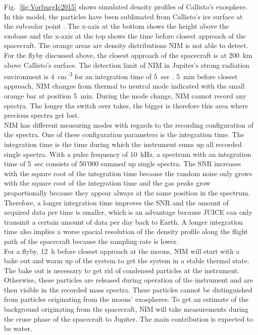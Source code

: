 	Fig.~\ref{fig:VorburgIc2015} shows simulated density profiles of Callisto's exosphere. In this model, the particles have been sublimated from Callisto's ice surface at the sub-solar point \cite{Vorburger2015}. The x-axis at the bottom shows the height above the exobase and the x-axis at the top shows the time before closest approach of the spacecraft. The orange areas are density distributions NIM is not able to detect. For the flyby discussed above, the closest approach of the spacecraft is at 200~km above Callisto's surface. The detection limit of NIM in Jupiter's strong radiation environment is 4~cm\textsuperscript{--3} for an integration time of 5~sec \cite{Lasi_2017_Detector}. 5~min before closest approach, NIM changes from thermal to neutral mode indicated with the small orange bar at position 5~min. During the mode change, NIM cannot record any spectra. The longer the switch over takes, the bigger is therefore this area where precious spectra get lost.\\
	NIM has different measuring modes with regards to the recording configuration of the spectra. One of these configuration parameters is the integration time. The integration time is the time during which the instrument sums up all recorded single spectra. With a pulse frequency of 10~kHz, a spectrum with an integration time of 5~sec consists of 50'000 summed up single spectra. The SNR increases with the square root of the integration time because the random noise only grows with the square root of the integration time and the gas peaks grow proportionally because they appear always at the same position in the spectrum. Therefore, a longer integration time improves the SNR and the amount of acquired data per time is smaller, which is an advantage because JUICE can only transmit a certain amount of data per day back to Earth. A longer integration time also implies a worse spacial resolution of the density profile along the flight path of the spacecraft because the sampling rate is lower.\\
	For a flyby, 12~h before closest approach at the moons, NIM will start with a bake out and warm up of the system to get the system in a stable thermal state. The bake out is necessary to get rid of condensed particles at the instrument. Otherwise, these particles are released during operation of the instrument and are then visible in the recorded mass spectra. These particles cannot be distinguished from particles originating from the moons' exospheres. To get an estimate of the background originating from the spacecraft, NIM will take measurements during the cruse phase of the spacecraft to Jupiter. The main contribution is expected to be water.\\
